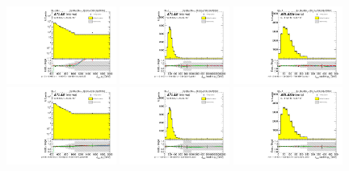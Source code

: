 \begin{figure}[htbp!]
\begin{center}
\includegraphics[angle=270, width=0.32\textwidth]{./figures/boosted/Reweight/Fits/Moriond_bkg_3_NoTag_4Trk_subl_Incl_leadHCand_Pt_m_1.pdf}
\includegraphics[angle=270, width=0.32\textwidth]{./figures/boosted/Reweight/Fits/Moriond_bkg_3_NoTag_4Trk_subl_Incl_leadHCand_trk0_Pt.pdf}
\includegraphics[angle=270, width=0.32\textwidth]{./figures/boosted/Reweight/Fits/Moriond_bkg_3_NoTag_4Trk_subl_Incl_leadHCand_trk1_Pt.pdf} \\
\includegraphics[angle=270, width=0.32\textwidth]{./figures/boosted/Reweight/Fits/Moriond_bkg_9_NoTag_4Trk_subl_Incl_leadHCand_Pt_m_1.pdf}
\includegraphics[angle=270, width=0.32\textwidth]{./figures/boosted/Reweight/Fits/Moriond_bkg_9_NoTag_4Trk_subl_Incl_leadHCand_trk0_Pt.pdf}
\includegraphics[angle=270, width=0.32\textwidth]{./figures/boosted/Reweight/Fits/Moriond_bkg_9_NoTag_4Trk_subl_Incl_leadHCand_trk1_Pt.pdf} \\

\end{center}
\end{figure}
